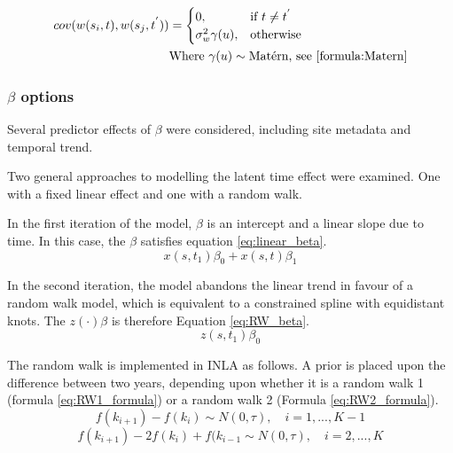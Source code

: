 \documentclass{article}
\begin{document}
	\begin{align} \label{eq:cov_structure}
		cov(w(s_i,t), w(s_j,t^{'})) &=
		\begin{cases} 
			0, & \text{if } t \neq t^{'} \\
			\sigma^2_w \gamma(u), & \text{otherwise}    
		\end{cases} \\
		& \text{Where } \gamma(u) \sim \text{Mat\'{e}rn, see \ref{formula:Matern}} \nonumber
	\end{align} 

\subsubsection*{$\beta$ options}
\label{subsubsec:betaopts}
Several predictor effects of $\beta$ were considered, including site metadata and temporal trend.

Two general approaches to modelling the latent time effect were examined.  One with a fixed linear effect and one with a random walk.

In the first iteration of the model, $\beta$ is an intercept and a linear slope due to time.  In this case, the $\beta$ satisfies equation \ref{eq:linear_beta}.
\begin{equation} \label{eq:linear_beta} 
	x(s,t_1)\beta_0 + x(s,t)\beta_1
\end{equation}  

In the second iteration, the model abandons the linear trend in favour of a random walk model, which is equivalent to a constrained spline with equidistant knots.  The $z(\cdot)\beta$ is therefore Equation \ref{eq:RW_beta}.
\begin{equation} \label{eq:RW_beta}
	z(s,t_1)\beta_0
\end{equation}

The random walk is implemented in \ac{INLA} as follows.  A prior is placed upon the difference between two years, depending upon whether it is a random walk 1 (formula \ref{eq:RW1_formula}) or a random walk 2 (Formula \ref{eq:RW2_formula}).
\begin{equation} \label{eq:RW1_formula}
	f(k_{i + 1}) - f(k_i) \sim N(0,\tau), \quad i = 1, ..., K-1
\end{equation}
\begin{equation} \label{eq:RW2_formula}
	f(k_{i+1}) - 2f(k_i) + f(k_{i-1} \sim N(0, \tau), \quad i = 2, ..., K
\end{equation}
\end{document}

